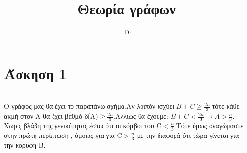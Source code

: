 \documentclass{article}
\title{Θεωρία γράφων \\ \exerciseset}
\author{\studentname \qquad  ID: \suid}
\begin{document}
\maketitle

\section*{Άσκηση 1}
 \\
Ο γράφος μας θα έχει το παραπάνω σχήμα.Αν λοιπόν ισχύει $ B+C\ge \frac{2n}{3}$ τότε κάθε ακμή στον Α θα έχει βαθμό δ(Α)$ \ge \frac{2n}{3}$.Αλλιώς θα έχουμε: $ B+C< \frac{2n}{3} \rightarrow A > \frac{n}{3}$. Χωρίς βλάβη της γενικότητας έστω ότι οι κόμβοι του C$<\frac{n}{3}$ Τότε όμως 
αναγώμαστε στην πρώτη περίπτωση , όμοιος για για C$>\frac{n}{3}$ με την διαφορά ότι τώρα γίνεται για την κορυφή Β. 
\end{document}
